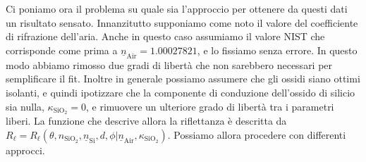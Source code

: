 \documentclass[
    prb,altaffilletter,citeautoscript,
    amsmath,amssymb,
    showpacs,showkeys,floatfix,
    reprint
]{revtex4-1}
\begin{document}
Ci poniamo ora il problema su quale sia l'approccio per ottenere da questi dati un risultato sensato. Innanzitutto supponiamo come noto il valore del coefficiente di rifrazione dell'aria. Anche in questo caso assumiamo il valore NIST che corrisponde come prima a $\underline n_\mathrm{Air} = \num{1.00027821}$, e lo fissiamo senza errore. In questo modo abbiamo rimosso due gradi di libertà che non sarebbero necessari per semplificare il fit. Inoltre in generale possiamo assumere che gli ossidi siano ottimi isolanti, e quindi ipotizzare che la componente di conduzione dell'ossido di silicio sia nulla, $\kappa_\mathrm{SiO_2}=0$, e rimuovere un ulteriore grado di libertà tra i parametri liberi. La funzione che descrive allora la riflettanza è descritta da $R_\mathrm{\ell} = R_\mathrm{\ell} (\theta, n_\mathrm{SiO_2}, \underline n_\mathrm{Si}, d, \phi| \underline n_\mathrm{Air}, \kappa_\mathrm{SiO_2})$. Possiamo allora procedere con differenti approcci. 
\end{document}
